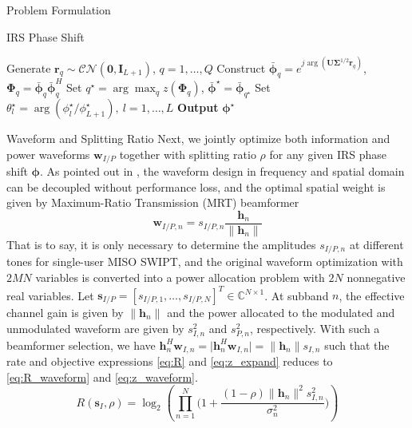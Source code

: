 \documentclass{IEEEtran}
\begin{document}
\begin{section}{Problem Formulation}
\begin{subsection}{IRS Phase Shift}
\begin{algorithm}
\begin{algorithmic}[1]
					\State Generate $\boldsymbol{r}_q \sim \mathcal{CN}(\boldsymbol{0},\boldsymbol{I}_{L+1})$, $q=1,\dots,Q$
					\State Construct $\bar{\boldsymbol{\phi}}_q=e^{j\arg\left(\boldsymbol{U}\boldsymbol{\Sigma}^{1/2}\boldsymbol{r}_q\right)}$, $\boldsymbol{\Phi}_q=\bar{\boldsymbol{\phi}}_q\bar{\boldsymbol{\phi}}_q^H$
					\State Set $q^{\star}=\arg\max_q{z(\boldsymbol{\Phi}_q)}$, $\bar{\boldsymbol{\phi}}^\star=\bar{\boldsymbol{\phi}}_{q^{\star}}$
				\EndIf
				\State Set $\theta_l^\star=\arg(\phi_l^\star/\phi_{L+1}^\star), \ l=1,\dots,L$
				\State \textbf{Output} $\boldsymbol{\phi}^{\star}$
			\end{algorithmic}
		\end{algorithm}
	\end{subsection}

	\begin{subsection}{Waveform and Splitting Ratio}
		Next, we jointly optimize both information and power waveforms $\boldsymbol{w}_{I/P}$ together with splitting ratio $\rho$ for any given IRS phase shift $\boldsymbol{\phi}$. As pointed out in \cite{Clerckx2018b}, the waveform design in frequency and spatial domain can be decoupled without performance loss, and the optimal spatial weight is given by Maximum-Ratio Transmission (MRT) beamformer
		\begin{equation}\label{eq:w_IP}
			\boldsymbol{w}_{I/P,n}=s_{I/P,n}\frac{\boldsymbol{h}_n}{\lVert{\boldsymbol{h}_n}\rVert}
		\end{equation}
		That is to say, it is only necessary to determine the amplitudes $s_{I/P,n}$ at different tones for single-user MISO SWIPT, and the original waveform optimization with $2MN$ variables is converted into a power allocation problem with $2N$ nonnegative real variables. Let $\boldsymbol{s}_{I/P}=[s_{I/P,1},\dots,s_{I/P,N}]^T \in \mathbb{C}^{N \times 1}$. At subband $n$, the effective channel gain is given by $\lVert{\boldsymbol{h}_n}\rVert$ and the power allocated to the modulated and unmodulated waveform are given by $s_{I,n}^2$ and $s_{P,n}^2$, respectively. With such a beamformer selection, we have $\boldsymbol{h}_n^H\boldsymbol{w}_{I,n}=\lvert{\boldsymbol{h}_n^H\boldsymbol{w}_{I,n}}\rvert=\lVert{\boldsymbol{h}_n}\rVert s_{I,n}$ such that the rate and objective expressions \ref{eq:R} and \ref{eq:z_expand} reduces to \ref{eq:R_waveform} and \ref{eq:z_waveform}.
		\begin{equation}\label{eq:R_waveform}
			R(\boldsymbol{s}_I,\rho) = \log_2\left(\prod_{n=1}^N\biggl(1+\frac{(1-\rho)\lVert{\boldsymbol{h}_n}\rVert^2 s_{I,n}^2}{\sigma_n^2}\biggr)\right)

\end{equation}
\end{subsection}
\end{section}
\end{document}
